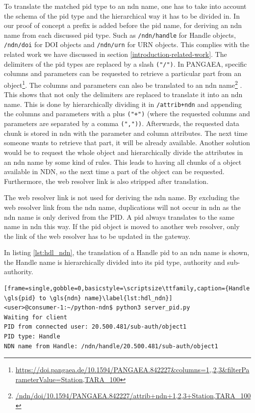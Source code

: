 To translate the matched \gls{pid} type to an \gls{ndn} name, one has to take into account the schema of the \gls{pid} type and the hierarchical way it has to be divided in. In our proof of concept a prefix is added before the \gls{pid} name, for deriving an \gls{ndn} name from each discussed \gls{pid} type. Such as \texttt{/ndn/handle} for Handle objects, \texttt{/ndn/doi} for DOI objects and \texttt{/ndn/urn} for URN objects. This complies with the related work we have discussed in section \ref{introduction-related-work}. The delimiters of the \gls{pid} types are replaced by a slash \texttt{("/")}. In PANGAEA, specific columns and parameters can be requested to retrieve a particular part from an object\footnote{\url{https://doi.pangaea.de/10.1594/PANGAEA.842227&columns=1,,2,3&filterParameterValue=Station,TARA_100}}. The columns and parameters can also be translated to an \gls{ndn} name\footnote{\url{/ndn/doi/10.1594/PANGAEA.842227/attrib+ndn+1,2,3+Station,TARA_100}} \cite{ndn-app-aware}. This shows that not only the delimiters are replaced to translate it into an \gls{ndn} name. This is done by hierarchically dividing it in \texttt{/attrib+ndn} and appending the columns and parameters with a plus \texttt{("+")} (where the requested columns and parameters are separated by a comma \texttt{(","))}. 
Afterwards, the requested data chunk is stored in \gls{ndn} with the parameter and column attributes. The next time someone wants to retrieve that part, it will be already available. Another solution would be to request the whole object and hierarchically divide the attributes in an \gls{ndn} name by some kind of rules. This leads to having all chunks of a object available in NDN, so the next time a part of the object can be requested.
Furthermore, the web resolver link is also stripped after translation.

The web resolver link is not used for deriving the \gls{ndn} name.
By excluding the web resolver link from the \gls{ndn} name, duplications will not occur in \gls{ndn} as the \gls{ndn} name is only derived from the PID. A \gls{pid} always translates to the same name in \gls{ndn} this way. 
If the \gls{pid} object is moved to another web resolver, only the link of the web resolver has to be updated in the gateway. 

In listing \ref{lst:hdl_ndn}, the translation of a Handle \gls{pid} to an \gls{ndn} name is shown, the Handle name is hierarchically divided into its \gls{pid} type, authority and sub-authority.
\vspace{1em}
\begin{lstlisting}[frame=single,gobble=0,basicstyle=\scriptsize\ttfamily,caption={Handle \gls{pid} to \gls{ndn} name}\label{lst:hdl_ndn}]
<user>@consumer-1:~/python-ndn$ python3 server_pid.py
Waiting for client
PID from connected user: 20.500.481/sub-auth/object1
PID type: Handle
NDN name from Handle: /ndn/handle/20.500.481/sub-auth/object1
\end{lstlisting}

